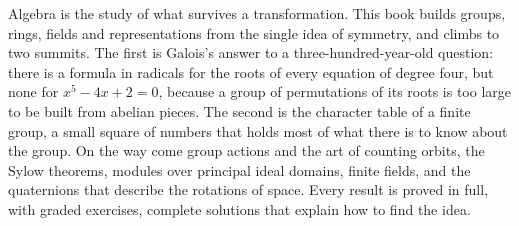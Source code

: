 Algebra is the study of what survives a transformation. This book builds groups, rings, fields and representations
from the single idea of symmetry, and climbs to two summits. The first is Galois's answer to a three-hundred-year-old
question: there is a formula in radicals for the roots of every equation of degree four, but none for
$x^5-4x+2=0$, because a group of permutations of its roots is too large to be built from abelian pieces. The second is
the character table of a finite group, a small square of numbers that holds most of what there is to know about the
group. On the way come group actions and the art of counting orbits, the Sylow theorems, modules over principal ideal
domains, finite fields, and the quaternions that describe the rotations of space. Every result is proved in full, with
graded exercises, complete solutions that explain how to find the idea.
